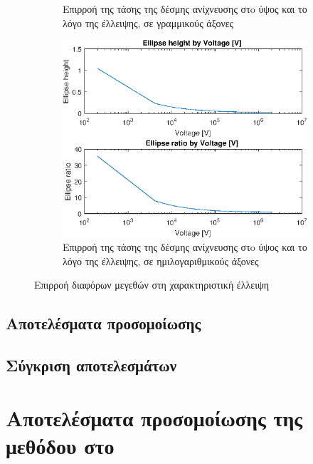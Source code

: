 \begin{figure}[tph]
\begin{subfigure}{0.47\textwidth}
		\centering
		\caption{Επιρροή της τάσης της δέσμης ανίχνευσης στo ύψος και το λόγο της έλλειψης, σε γραμμικούς άξονες}
		\label{fig:EBS-variables-voltage-linear}
	\end{subfigure}
	\par\bigskip
	\begin{subfigure}{0.47\textwidth}
		\includegraphics[width=\linewidth]{figures/MATLAB-variable-analysis/EBS-variables-voltage-log}
		\centering
		\caption{Επιρροή της τάσης της δέσμης ανίχνευσης στo ύψος και το λόγο της έλλειψης, σε ημιλογαριθμικούς άξονες}
		\label{fig:EBS-variables-voltage-log}
	\end{subfigure}
\caption{Επιρροή διαφόρων μεγεθών στη χαρακτηριστική έλλειψη}
\label{fig:beam-deflectoin}
\end{figure}

\subsection{Αποτελέσματα προσομοίωσης}



\subsection{Σύγκριση αποτελεσμάτων}

\section{Αποτελέσματα προσομοίωσης της μεθόδου στο }

